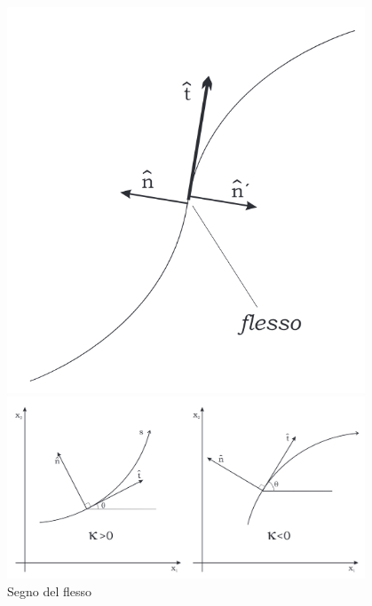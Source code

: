 \vspace{-1em}
\begin{figure}[H]
    \centering
    \begin{minipage}{0.3\textwidth}
        \centering
        \includegraphics[width=0.95\textwidth]{assets/flesso.png}
    \end{minipage}%
    \hspace{10pt}
    \begin{minipage}{0.65\textwidth}
        \centering
        \includegraphics[width=0.95\textwidth]{assets/segno_flesso.png}
    \end{minipage}
    \caption{Segno del flesso}
\end{figure}
\vspace{-1em}
\newpage

